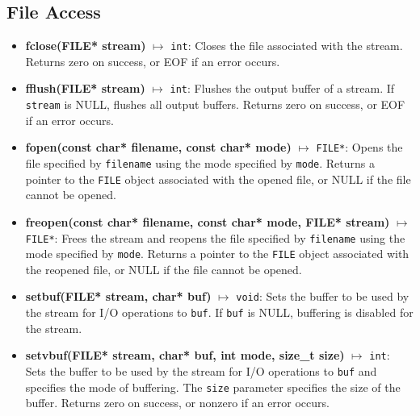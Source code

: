 \documentclass{report}
\begin{document}
    \subsection{File Access}
    \begin{itemize}
        \item \textbf{fclose(FILE* stream)} $\mapsto$ \texttt{int}: Closes the file associated with the stream. Returns zero on success, or EOF if an error occurs.
        \item \textbf{fflush(FILE* stream)} $\mapsto$ \texttt{int}: Flushes the output buffer of a stream. If \texttt{stream} is NULL, flushes all output buffers. Returns zero on success, or EOF if an error occurs.
        \item \textbf{fopen(const char* filename, const char* mode)} $\mapsto$ \texttt{FILE*}: Opens the file specified by \texttt{filename} using the mode specified by \texttt{mode}. Returns a pointer to the \texttt{FILE} object associated with the opened file, or NULL if the file cannot be opened.
        \item \textbf{freopen(const char* filename, const char* mode, FILE* stream)} $\mapsto$ \texttt{FILE*}: Frees the stream and reopens the file specified by \texttt{filename} using the mode specified by \texttt{mode}. Returns a pointer to the \texttt{FILE} object associated with the reopened file, or NULL if the file cannot be opened.
        \item \textbf{setbuf(FILE* stream, char* buf)} $\mapsto$ \texttt{void}: Sets the buffer to be used by the stream for I/O operations to \texttt{buf}. If \texttt{buf} is NULL, buffering is disabled for the stream.
        \item \textbf{setvbuf(FILE* stream, char* buf, int mode, size\_t size)} $\mapsto$ \texttt{int}: Sets the buffer to be used by the stream for I/O operations to \texttt{buf} and specifies the mode of buffering. The \texttt{size} parameter specifies the size of the buffer. Returns zero on success, or nonzero if an error occurs.
    \end{itemize}

    \bigbreak \noindent 
\end{document}
